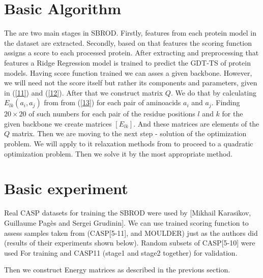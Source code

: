 \documentclass[12pt,twoside]{article}
\begin{document}
\section{Basic Algorithm}
 
The are two main stages in SBROD. Firstly, features from each protein model in the dataset are extracted. 
Secondly, based on that features the scoring function assigns a score to each processed protein. After extracting and preprocessing that features a Ridge Regression model is trained to predict the GDT-TS of protein models.
Having score function trained we can asses a given backbone. However, we will need not the score itself but rather its components and parameters, given in (\ref{11}) and (\ref{12}). 
After that we construct matrix $Q$. We do that by calculating $E_{lk}(a_i, a_j)$ from from (\ref{13}) for each pair of aminoacids $a_i$ and $a_j$. Finding $20\times20$ of such numbers for each pair of the residue positions $l$ and $k$ for the given backbone we create matrices $[E_{lk}]$. And these matrices are elements of the $Q$ matrix.
Then we are moving to the next step - solution of the optimization problem. We will apply to it relaxation methods from \cite{Riazanov:2016} to proceed to a quadratic optimization problem.
Then we solve it by the most appropriate method.

\section{Basic experiment}
Real CASP datasets for training the SBROD were used by [Mikhail Karasikov, Guillaume Pagès and Sergei Grudinin]. We can use trained scoring function to assess samples taken from (CASP[5-11], and MOULDER) just as the authors did (results of their experiments shown below). 
Random
subsets of CASP[5-10] were used For training and CASP11 (stage1 and stage2
together) for validation.

Then we construct Energy matrices as described in the previous section.
\end{document}
